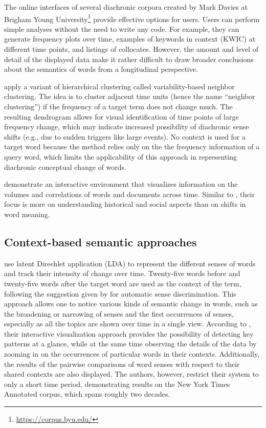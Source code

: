 \documentclass[output=paper%
]{langsci/langscibook}
\begin{document}
The online interfaces of several diachronic corpora created by Mark Davies at Brigham Young University\footnote{\url{https://corpus.byu.edu/}} provide effective options for users. Users can perform simple analyses without the need to write any code. For example, they can generate frequency plots over time, examples of keywords in context (KWIC) at different time points, and listings of collocates. However, the amount and level of detail  of the displayed data make it rather difficult to draw broader conclusions about the semantics of words from a longitudinal perspective.

\citet{hilpert2008assessing} apply a variant of hierarchical clustering called vari\-abil\-ity-based neighbor clustering. The idea is to cluster adjacent time units (hence the name ``neighbor clustering'') if the frequency of a target term does not change much. The resulting dendrogram allows for visual identification of time points of large frequency change, which may indicate increased possibility of diachronic sense shifts (e.g., due to sudden triggers like large events). No context is used for a target word because the method relies only on the the frequency information of a query word, which limits the applicability of this approach in representing diachronic conceptual change of words.

\citet{odijk2012time} demonstrate an interactive environment that visualizes information on the volumes and correlations of words and documents across time. Similar to \citet{michel2011quantitative}, their focus is more on understanding historical and social aspects than on shifts in word meaning. 

\subsection{Context-based semantic approaches}
\citet{rohrdantz2011towards} use latent Direchlet application (LDA) to represent the different senses of words and track their intensity of change over time. Twenty-five words before and twenty-five words after the target word are used as the context of the term, following the suggestion given by \citet{schutze1998} for automatic sense discrimination. This approach allows one to notice various kinds of semantic change in words, such as the broadening or narrowing of senses and the first occurrences of senses, especially as all the topics are shown over time in a single view. According to \citet{rohrdantz2011towards}, their interactive visualization approach provides the possibility of detecting key patterns at a glance, while at the same time observing the details of the data by zooming in on the occurrences of particular words in their contexts. Additionally, the results of the pairwise comparisons of word senses with respect to their shared contexts are also displayed. The authors, however, restrict their system to only a short time period, demonstrating results on the New York Times Annotated corpus, which spans roughly two decades. 
\end{document}
